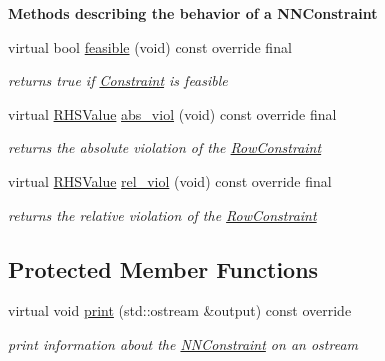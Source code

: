\begin{Indent}\textbf{ Methods describing the behavior of a N\+N\+Constraint}\par
\begin{DoxyCompactItemize}
\item 
virtual bool \mbox{\hyperlink{class_s_m_spp__di__unipi__it_1_1_n_n_constraint_a575ce9dd82d423f5d6e9699622935415}{feasible}} (void) const override final
\begin{DoxyCompactList}\small\item\em returns true if \mbox{\hyperlink{class_s_m_spp__di__unipi__it_1_1_constraint}{Constraint}} is feasible \end{DoxyCompactList}\item 
virtual \mbox{\hyperlink{class_s_m_spp__di__unipi__it_1_1_row_constraint_a8813536ab3b13a81c8e83a999ade3bd8}{R\+H\+S\+Value}} \mbox{\hyperlink{class_s_m_spp__di__unipi__it_1_1_n_n_constraint_a1e06e555eab5078e4d5ec16745778984}{abs\+\_\+viol}} (void) const override final
\begin{DoxyCompactList}\small\item\em returns the absolute violation of the \mbox{\hyperlink{class_s_m_spp__di__unipi__it_1_1_row_constraint}{Row\+Constraint}} \end{DoxyCompactList}\item 
virtual \mbox{\hyperlink{class_s_m_spp__di__unipi__it_1_1_row_constraint_a8813536ab3b13a81c8e83a999ade3bd8}{R\+H\+S\+Value}} \mbox{\hyperlink{class_s_m_spp__di__unipi__it_1_1_n_n_constraint_a44cb3a18055d2b46764d4eb21a0ff032}{rel\+\_\+viol}} (void) const override final
\begin{DoxyCompactList}\small\item\em returns the relative violation of the \mbox{\hyperlink{class_s_m_spp__di__unipi__it_1_1_row_constraint}{Row\+Constraint}} \end{DoxyCompactList}\end{DoxyCompactItemize}
\end{Indent}
\subsection*{Protected Member Functions}
\begin{DoxyCompactItemize}
\item 
\mbox{\label{class_s_m_spp__di__unipi__it_1_1_n_n_constraint_a59a9fcbf8f9f86d348344b2073644b0e}} 
virtual void \mbox{\hyperlink{class_s_m_spp__di__unipi__it_1_1_n_n_constraint_a59a9fcbf8f9f86d348344b2073644b0e}{print}} (std\+::ostream \&output) const override
\begin{DoxyCompactList}\small\item\em print information about the \mbox{\hyperlink{class_s_m_spp__di__unipi__it_1_1_n_n_constraint}{N\+N\+Constraint}} on an ostream \end{DoxyCompactList}\end{DoxyCompactItemize}
